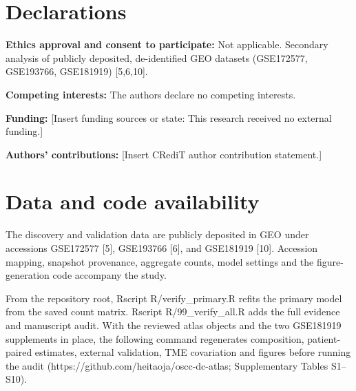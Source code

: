 \documentclass[11pt,a4paper]{article}
\begin{document}
\section*{Declarations}
\noindent\textbf{Ethics approval and consent to participate:} Not applicable. Secondary analysis of publicly deposited, de-identified GEO datasets (GSE172577, GSE193766, GSE181919) [5,6,10].\par\medskip
\noindent\textbf{Competing interests:} The authors declare no competing interests.\par\medskip
\noindent\textbf{Funding:} [Insert funding sources or state: This research received no external funding.]\par\medskip
\noindent\textbf{Authors' contributions:} [Insert CRediT author contribution statement.]

\section*{Data and code availability}
The discovery and validation data are publicly deposited in GEO under accessions GSE172577 [5], GSE193766 [6], and GSE181919 [10]. Accession mapping, snapshot provenance, aggregate counts, model settings and the figure-generation code accompany the study.

From the repository root, Rscript R/verify\_primary.R refits the primary model from the saved count matrix. Rscript R/99\_verify\_all.R adds the full evidence and manuscript audit. With the reviewed atlas objects and the two GSE181919 supplements in place, the following command regenerates composition, patient-paired estimates, external validation, TME covariation and figures before running the audit (https://github.com/heitaoja/oscc-dc-atlas; Supplementary Tables S1--S10).
\end{document}
